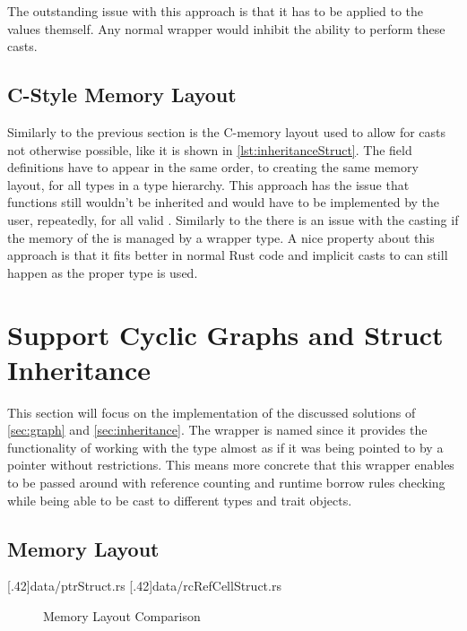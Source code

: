 \documentclass[thesis]{subfiles}
\begin{document}
    The outstanding issue with this approach is that it has to be applied to the values themself.
    Any normal wrapper would inhibit the ability to perform these casts.

  \subsection{C-Style Memory Layout}
    Similarly to the previous section is the C-memory layout used to allow for casts not otherwise possible, like it is shown in \autoref{lst:inheritanceStruct}.
    The field definitions have to appear in the same order, to creating the same memory layout, for all types in a type hierarchy\autocite[repr(r)]{rust-nom}.
    This approach has the issue that functions still wouldn't be inherited and would have to be implemented by the user, repeatedly, for all valid \structs.
    Similarly to the \traits there is an issue with the casting if the memory of the \struct is managed by a wrapper type.
    A nice property about this approach is that it fits better in normal Rust code and implicit casts to  can still happen as the proper type is used.


\section{Support Cyclic Graphs and Struct Inheritance}
  This section will focus on the implementation of the discussed solutions of \autoref{sec:graph} and \autoref{sec:inheritance}.
  The wrapper is named \PtrT since it provides the functionality of working with the type \T almost as if it was being pointed to by a pointer without restrictions.
  This means more concrete that this wrapper enables \T to be passed around with reference counting and runtime borrow rules checking while being able to be cast to different types and trait objects.

  \subsection{Memory Layout}
    \LstTikzBox{\ptrStruct}[.42\linewidth]{data/ptrStruct.rs}
    \LstTikzBox{\rcRefCellStruct}[.42\linewidth]{data/rcRefCellStruct.rs}
    \begin{figure}[ht]
      \captionsetup{type=lstlisting}
      \hfill%
      \caption{Memory Layout Comparison}\label{lst:memoryLayout}
    \end{figure}
\end{document}
